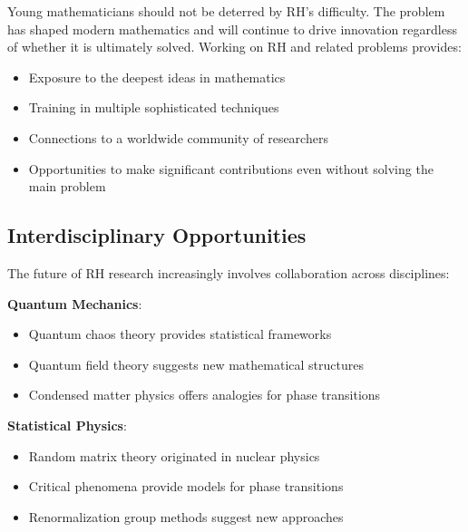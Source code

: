 \begin{encouragement}
Young mathematicians should not be deterred by RH's difficulty. The problem has shaped modern mathematics and will continue to drive innovation regardless of whether it is ultimately solved. Working on RH and related problems provides:
\begin{itemize}
\item Exposure to the deepest ideas in mathematics
\item Training in multiple sophisticated techniques
\item Connections to a worldwide community of researchers
\item Opportunities to make significant contributions even without solving the main problem
\end{itemize}
\end{encouragement}

\subsection{Interdisciplinary Opportunities}
\label{subsec:interdisciplinary}

The future of RH research increasingly involves collaboration across disciplines:

\begin{collaboration}
\textbf{Quantum Mechanics}: 
\begin{itemize}
\item Quantum chaos theory provides statistical frameworks
\item Quantum field theory suggests new mathematical structures
\item Condensed matter physics offers analogies for phase transitions
\end{itemize}

\textbf{Statistical Physics}:
\begin{itemize}
\item Random matrix theory originated in nuclear physics
\item Critical phenomena provide models for phase transitions
\item Renormalization group methods suggest new approaches
\end{itemize}
\end{collaboration}

